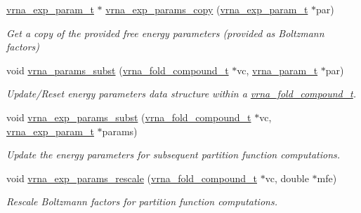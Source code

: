 \begin{DoxyCompactItemize}
\mbox{\hyperlink{group__energy__parameters_ga01d8b92fe734df8d79a6169482c7d8d8}{vrna\+\_\+exp\+\_\+param\+\_\+t}} $\ast$ \mbox{\hyperlink{group__energy__parameters_ga70bc46be7cfa5434a71efe241c4f0609}{vrna\+\_\+exp\+\_\+params\+\_\+copy}} (\mbox{\hyperlink{group__energy__parameters_ga01d8b92fe734df8d79a6169482c7d8d8}{vrna\+\_\+exp\+\_\+param\+\_\+t}} $\ast$par)
\begin{DoxyCompactList}\small\item\em Get a copy of the provided free energy parameters (provided as Boltzmann factors) \end{DoxyCompactList}\item 
void \mbox{\hyperlink{group__energy__parameters_ga5d1909208f7ea3baa98b75afaa1f62ca}{vrna\+\_\+params\+\_\+subst}} (\mbox{\hyperlink{group__fold__compound_ga1b0cef17fd40466cef5968eaeeff6166}{vrna\+\_\+fold\+\_\+compound\+\_\+t}} $\ast$vc, \mbox{\hyperlink{group__energy__parameters_ga8a69ca7d787e4fd6079914f5343a1f35}{vrna\+\_\+param\+\_\+t}} $\ast$par)
\begin{DoxyCompactList}\small\item\em Update/\+Reset energy parameters data structure within a \mbox{\hyperlink{group__fold__compound_ga1b0cef17fd40466cef5968eaeeff6166}{vrna\+\_\+fold\+\_\+compound\+\_\+t}}. \end{DoxyCompactList}\item 
void \mbox{\hyperlink{group__energy__parameters_ga8e7ac4fab3b0cc03afbc134eaafb3525}{vrna\+\_\+exp\+\_\+params\+\_\+subst}} (\mbox{\hyperlink{group__fold__compound_ga1b0cef17fd40466cef5968eaeeff6166}{vrna\+\_\+fold\+\_\+compound\+\_\+t}} $\ast$vc, \mbox{\hyperlink{group__energy__parameters_ga01d8b92fe734df8d79a6169482c7d8d8}{vrna\+\_\+exp\+\_\+param\+\_\+t}} $\ast$params)
\begin{DoxyCompactList}\small\item\em Update the energy parameters for subsequent partition function computations. \end{DoxyCompactList}\item 
void \mbox{\hyperlink{group__energy__parameters_gad607bc3a5b5da16400e2ca4ea5560233}{vrna\+\_\+exp\+\_\+params\+\_\+rescale}} (\mbox{\hyperlink{group__fold__compound_ga1b0cef17fd40466cef5968eaeeff6166}{vrna\+\_\+fold\+\_\+compound\+\_\+t}} $\ast$vc, double $\ast$mfe)
\begin{DoxyCompactList}\small\item\em Rescale Boltzmann factors for partition function computations. \end{DoxyCompactList}\item 

\end{DoxyCompactItemize}
